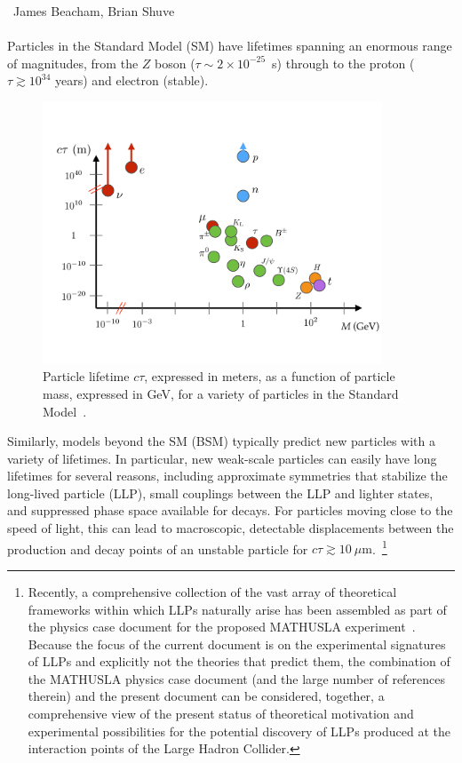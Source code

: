 ~James Beacham, Brian Shuve \\
\text{ \; }\\

\noindent Particles in the Standard Model (SM) have lifetimes spanning an enormous range of magnitudes, from the $Z$ boson ($\tau\sim2\times10^{-25}$~s) through to the proton ($\tau\gtrsim10^{34}$ years) and electron (stable).

\begin{figure}[htb]
\centering
\includegraphics[width=0.9\textwidth]{plots/lifetime_plot.pdf}
\caption{Particle lifetime $c\tau$, expressed in meters, as a function of particle mass, expressed in GeV, for a variety of particles in the Standard Model~\cite{Shuve:2017AprilWorkshop}.}
 \label{fig:SMLifetimes}
\end{figure}

Similarly, models beyond the SM (BSM) typically predict new particles with a variety of lifetimes.
In particular, new weak-scale particles can easily have long lifetimes for several reasons, including approximate symmetries that stabilize the long-lived particle (LLP), small couplings between the LLP and lighter states, and suppressed phase space available for decays.
For particles moving close to the speed of light, this can lead to macroscopic, detectable displacements between the production and decay points of an unstable particle for $c\tau\gtrsim 10~\mu\mathrm{m}$.~\footnote{Recently, a comprehensive collection of the vast array of theoretical frameworks within which LLPs naturally arise has been assembled as part of the physics case document for the proposed MATHUSLA experiment~\cite{Curtin:2018mvb}. Because the focus of the current document is on the experimental signatures of LLPs and explicitly not the theories that predict them,
the combination of the MATHUSLA physics case document (and the large number of references therein) and the present document can be considered, together, a comprehensive view of the present status of theoretical motivation and experimental possibilities for the potential discovery of LLPs produced at the interaction points of the Large Hadron Collider.}

